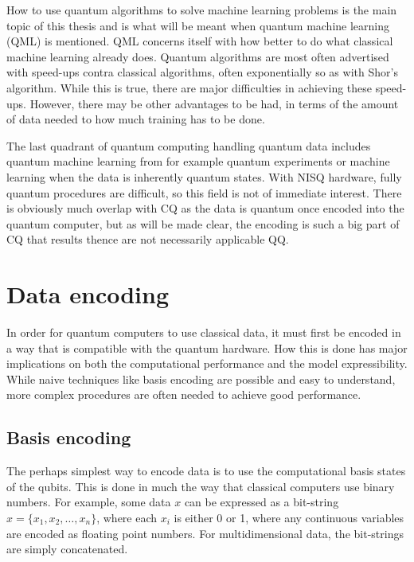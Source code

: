 How to use quantum algorithms to solve machine learning problems is the main topic of this thesis and is what will be meant when quantum machine learning (QML) is mentioned. QML concerns itself with how better to do what classical machine learning already does. Quantum algorithms are most often advertised with speed-ups contra classical algorithms, often exponentially so as with Shor's algorithm. While this is true, there are major difficulties in achieving these speed-ups. However, there may be other advantages to be had, in terms of the amount of data needed to how much training has to be done.

The last quadrant of quantum computing handling quantum data includes quantum machine learning from for example quantum experiments or machine learning when the data is inherently quantum states. With NISQ hardware, fully quantum procedures are difficult, so this field is not of immediate interest. There is obviously much overlap with CQ as the data is quantum once encoded into the quantum computer, but as will be made clear, the encoding is such a big part of CQ that results thence are not necessarily applicable QQ.




\section{Data encoding}
\label{sec:data_encoding}
In order for quantum computers to use classical data, it must first be encoded in a way that is compatible with the quantum hardware. How this is done has major implications on both the computational performance and the model expressibility. While naive techniques like basis encoding are possible and easy to understand, more complex procedures are often needed to achieve good performance.

\subsection{Basis encoding}
The perhaps simplest way to encode data is to use the computational basis states of the qubits. This is done in much the way that classical computers use binary numbers. For example, some data $x$ can be expressed as a bit-string $x = \{x_1, x_2, \dots, x_n\}$, where each $x_i$ is either 0 or 1, where any continuous variables are encoded as floating point numbers. For multidimensional data, the bit-strings are simply concatenated.

